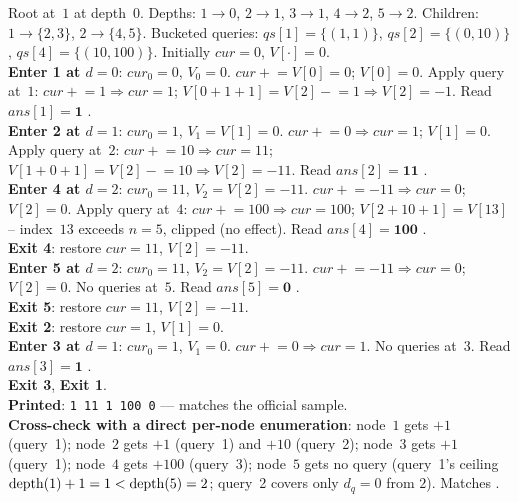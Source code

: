 \begin{tracebox}[Official Sample -- $n{=}5$, edges $1\!-\!2, 1\!-\!3, 2\!-\!4, 2\!-\!5$, three queries]
Root at~$1$ at depth~$0$. Depths: $1\!\to\!0$, $2\!\to\!1$, $3\!\to\!1$,
$4\!\to\!2$, $5\!\to\!2$. Children: $1\!\to\!\{2,3\}$, $2\!\to\!\{4,5\}$.
Bucketed queries: $\mathit{qs}[1]=\{(1,1)\}$, $\mathit{qs}[2]=\{(0,10)\}$,
$\mathit{qs}[4]=\{(10,100)\}$. Initially $\mathit{cur}=0$, $\mathit{V}[\cdot]=0$.
\\[3pt]
\textbf{Enter 1 at $d{=}0$}: $\mathit{cur}_0=0$, $\mathit{V}_0=0$.
$\mathit{cur}\mathrel{+}=\mathit{V}[0]=0$; $\mathit{V}[0]=0$. Apply query at~$1$:
$\mathit{cur}\mathrel{+}=1\Rightarrow \mathit{cur}=1$; $\mathit{V}[0+1+1]=\mathit{V}[2]\mathrel{-}=1\Rightarrow \mathit{V}[2]=-1$.
Read $\mathit{ans}[1]=\mathbf{1}$ \checkmark.\\
\textbf{Enter 2 at $d{=}1$}: $\mathit{cur}_0=1$, $\mathit{V}_1=\mathit{V}[1]=0$.
$\mathit{cur}\mathrel{+}=0\Rightarrow \mathit{cur}=1$; $\mathit{V}[1]=0$. Apply query at~$2$:
$\mathit{cur}\mathrel{+}=10\Rightarrow \mathit{cur}=11$; $\mathit{V}[1+0+1]=\mathit{V}[2]\mathrel{-}=10\Rightarrow \mathit{V}[2]=-11$.
Read $\mathit{ans}[2]=\mathbf{11}$ \checkmark.\\
\textbf{Enter 4 at $d{=}2$}: $\mathit{cur}_0=11$, $\mathit{V}_2=\mathit{V}[2]=-11$.
$\mathit{cur}\mathrel{+}=-11\Rightarrow \mathit{cur}=0$; $\mathit{V}[2]=0$. Apply query at~$4$:
$\mathit{cur}\mathrel{+}=100\Rightarrow \mathit{cur}=100$; $\mathit{V}[2+10+1]=\mathit{V}[13]$ -- index~$13$ exceeds $n{=}5$, clipped (no effect).
Read $\mathit{ans}[4]=\mathbf{100}$ \checkmark.\\
\textbf{Exit 4}: restore $\mathit{cur}=11$, $\mathit{V}[2]=-11$.\\
\textbf{Enter 5 at $d{=}2$}: $\mathit{cur}_0=11$, $\mathit{V}_2=\mathit{V}[2]=-11$.
$\mathit{cur}\mathrel{+}=-11\Rightarrow \mathit{cur}=0$; $\mathit{V}[2]=0$. No queries at~$5$.
Read $\mathit{ans}[5]=\mathbf{0}$ \checkmark.\\
\textbf{Exit 5}: restore $\mathit{cur}=11$, $\mathit{V}[2]=-11$.\\
\textbf{Exit 2}: restore $\mathit{cur}=1$, $\mathit{V}[1]=0$.\\
\textbf{Enter 3 at $d{=}1$}: $\mathit{cur}_0=1$, $\mathit{V}_1=0$.
$\mathit{cur}\mathrel{+}=0\Rightarrow \mathit{cur}=1$. No queries at~$3$.
Read $\mathit{ans}[3]=\mathbf{1}$ \checkmark.\\
\textbf{Exit 3}, \textbf{Exit 1}.\\[3pt]
\textbf{Printed}: \texttt{1 11 1 100 0} \checkmark --- matches the
official sample.\\
\textbf{Cross-check with a direct per-node enumeration}: node~$1$ gets
$+1$ (query~1); node~$2$ gets $+1$ (query~1) and $+10$ (query~2);
node~$3$ gets $+1$ (query~1); node~$4$ gets $+100$ (query~3); node~$5$
gets no query (query~1's ceiling $\operatorname{depth}(1)+1=1 < \operatorname{depth}(5)=2$; query~2
covers only $d_q=0$ from $2$). Matches \checkmark.
\end{tracebox}

